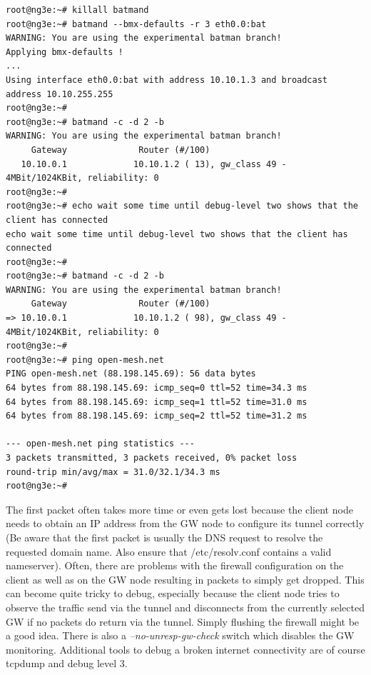 \documentclass[11pt]{article}
\begin{document}
\begin{enumerate}
\begin{small} \begin{verbatim}
root@ng3e:~# killall batmand
root@ng3e:~# batmand --bmx-defaults -r 3 eth0.0:bat
WARNING: You are using the experimental batman branch!
Applying bmx-defaults !
...
Using interface eth0.0:bat with address 10.10.1.3 and broadcast address 10.10.255.255
root@ng3e:~# 
root@ng3e:~# batmand -c -d 2 -b
WARNING: You are using the experimental batman branch!
     Gateway              Router (#/100)
   10.10.0.1             10.10.1.2 ( 13), gw_class 49 - 4MBit/1024KBit, reliability: 0
root@ng3e:~#
root@ng3e:~# echo wait some time until debug-level two shows that the client has connected
echo wait some time until debug-level two shows that the client has connected
root@ng3e:~#
root@ng3e:~# batmand -c -d 2 -b
WARNING: You are using the experimental batman branch!
     Gateway              Router (#/100)
=> 10.10.0.1             10.10.1.2 ( 98), gw_class 49 - 4MBit/1024KBit, reliability: 0
root@ng3e:~#
root@ng3e:~# ping open-mesh.net
PING open-mesh.net (88.198.145.69): 56 data bytes
64 bytes from 88.198.145.69: icmp_seq=0 ttl=52 time=34.3 ms
64 bytes from 88.198.145.69: icmp_seq=1 ttl=52 time=31.0 ms
64 bytes from 88.198.145.69: icmp_seq=2 ttl=52 time=31.2 ms

--- open-mesh.net ping statistics ---
3 packets transmitted, 3 packets received, 0% packet loss
round-trip min/avg/max = 31.0/32.1/34.3 ms
root@ng3e:~#
\end{verbatim} \end{small}

The first packet often takes more time or even gets lost because the client node needs to obtain an IP address from the GW node to configure its tunnel correctly (Be aware that the first packet is usually the DNS request to resolve the requested domain name. Also ensure that /etc/resolv.conf contains a valid nameserver).
Often, there are problems with the firewall configuration on the client as well as on the GW node resulting in packets to simply get dropped. 
This can become quite tricky to debug, especially because the client node tries to observe the traffic send via the tunnel and disconnects from the currently selected GW if no packets do return via the tunnel.
Simply flushing the firewall might be a good idea.
There is also a \emph{--no-unresp-gw-check} switch which disables the GW monitoring.
Additional tools to debug a broken internet connectivity are of course tcpdump and debug level 3.








\end{enumerate}
\end{document}
